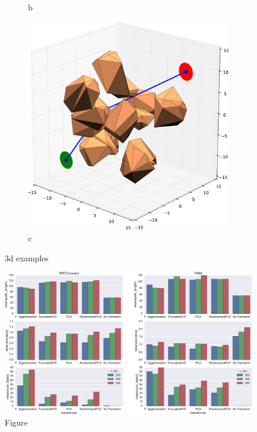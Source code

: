 \documentclass[12pt]{article}
\begin{document}
\begin{figure}[t!]
\begin{subfigure}[t]{0.32\textwidth}
        \caption{b}
    \end{subfigure}
    \begin{subfigure}[t]{0.32\textwidth}
        \centering
        \includegraphics[width=\textwidth]{3d_example_3.pdf}
        \caption{c}
    \end{subfigure}
    \caption{3d examples}
    \label{fig:3d_examples}
\end{figure}

\begin{figure}[h!]
    \centering
    \includegraphics[width=\textwidth]{plots}
    \caption{Figure}
\end{figure}
\end{document}
